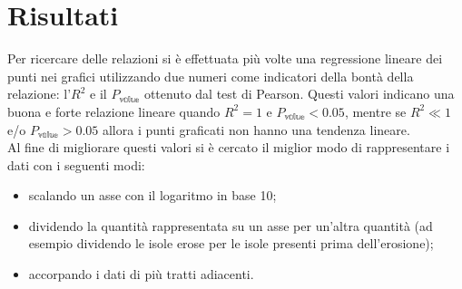 \section{Risultati}

Per ricercare delle relazioni si è effettuata più volte una regressione lineare dei punti nei grafici utilizzando due numeri come indicatori della bontà della relazione: l'$R^2$ e il $P_\mathbb{value}$ ottenuto dal test di Pearson.
Questi valori indicano una buona e forte relazione lineare quando $R^2 = 1$ e $P_\mathbb{value} < 0.05$, mentre se $R^2 \ll 1$ e/o $P_\mathbb{value} > 0.05$ allora i punti graficati non hanno una tendenza lineare.
\\
Al fine di migliorare questi valori si è cercato il miglior modo di rappresentare i dati con i seguenti modi:
%
\begin{itemize}
	\item scalando un asse con il logaritmo in base 10;
	\item dividendo la quantità rappresentata su un asse per un'altra quantità (ad esempio dividendo le isole erose per le isole presenti prima dell'erosione);
	\item accorpando i dati di più tratti adiacenti.
\end{itemize}